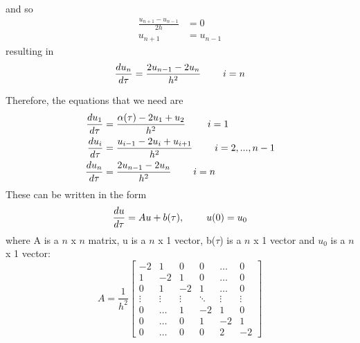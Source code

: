 \documentclass{article}
\begin{document}
and so
\begin{equation*}
\begin{split}
    \frac{u_{n+1}-u_{n-1}}{2h} &= 0 \\
    u_{n+1} &= u_{n-1}
\end{split}
\end{equation*}
resulting in
\begin{equation*}
    \frac{d u_n}{d\tau} = \frac{2u_{n-1} - 2u_n}{h^2}  \hspace{0.8cm} i = n
\end{equation*}

\noindent
Therefore, the equations that we need are
\begin{equation*}
\begin{split}
    \frac{d u_1}{d\tau} &= \frac{\alpha(\tau) - 2u_1 + u_{2}}{h^2}  \hspace{0.8cm} i = 1 \\
    \frac{d u_i}{d\tau} &= \frac{u_{i-1} - 2u_i + u_{i+1}}{h^2}  \hspace{0.8cm} i = 2, ..., n-1    \\
    \frac{d u_n}{d\tau} &= \frac{2u_{n-1} - 2u_n}{h^2}  \hspace{0.8cm} i = n
\end{split}
\end{equation*}
These can be written in the form
\begin{equation*}
    \frac{d u}{d \tau} = Au + b(\tau), \hspace{0.8cm} u(0) = u_0
\end{equation*}
where A is a $n$ x $n$ matrix, u is a $n$ x 1 vector, b($\tau$) is a $n$ x 1 vector and $u_0$ is a $n$ x 1 vector:
\begin{equation*}
    A = \frac{1}{h^2} 
\begin{bmatrix}
    -2     &  1     &  0     &  0     & \dots  &  0     \\
    1      & -2     &  1     &  0     & \dots  &  0     \\
    0      &  1     & -2     &  1     & \dots  &  0     \\
    \vdots & \vdots & \vdots & \ddots & \vdots & \vdots \\
    0      & \dots  &  1     & -2     &  1     &  0     \\
    0      & \dots  &  0     &  1     & -2     &  1     \\
    0      & \dots  &  0     &  0     &  2     & -2
\end{bmatrix}
\end{equation*}
\end{document}

